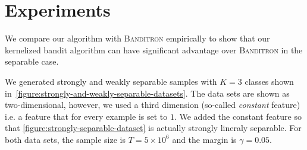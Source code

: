 \section{Experiments}
\label{sec:experiments}

We compare our algorithm with \textsc{Banditron} empirically to show that our
kernelized bandit algorithm can have significant advantage over
\textsc{Banditron} in the separable case.

We generated strongly and weakly separable samples with $K=3$ classes shown
in~\autoref{figure:strongly-and-weakly-separable-datasets}. The data sets are
shown as two-dimensional, however, we used a third dimension (so-called
\emph{constant} feature) i.e. a feature that for every example is set to $1$. We
added the constant feature so that \autoref{figure:strongly-separable-dataset}
is actually strongly lineraly separable. For both data sets, the sample size is
$T=5\times 10^6$ and the margin is $\gamma=0.05$.

